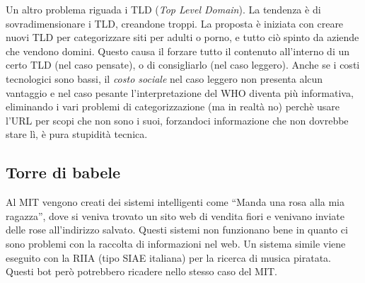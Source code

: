 Un altro problema riguada i TLD (\textit{Top Level Domain}). La tendenza \`e di sovradimensionare i TLD, creandone troppi. La proposta \`e iniziata con creare nuovi TLD per categorizzare siti per adulti o porno, e tutto ci\`o spinto da aziende che vendono domini. Questo causa il forzare tutto il contenuto all'interno di un certo TLD (nel caso pensate), o di consigliarlo (nel caso leggero). Anche se i costi tecnologici sono bassi, il \textit{costo sociale} nel caso leggero non presenta alcun vantaggio e nel caso pesante l'interpretazione del WHO diventa pi\`u informativa, eliminando i vari problemi di categorizzazione (ma in realt\`a no) perch\`e usare l'URL per scopi che non sono i suoi, forzandoci informazione che non dovrebbe stare l\`i, \`e pura stupidit\`a tecnica.


\subsection{Torre di babele}

Al MIT vengono creati dei sistemi intelligenti come ``Manda una rosa alla mia ragazza'', dove si veniva trovato un sito web di vendita fiori e venivano inviate delle rose all'indirizzo salvato. Questi sistemi non funzionano bene in quanto ci sono problemi con la raccolta di informazioni nel web.
Un sistema simile viene eseguito con la RIIA (tipo SIAE italiana) per la ricerca di musica piratata. Questi bot per\`o potrebbero ricadere nello stesso caso del MIT.
